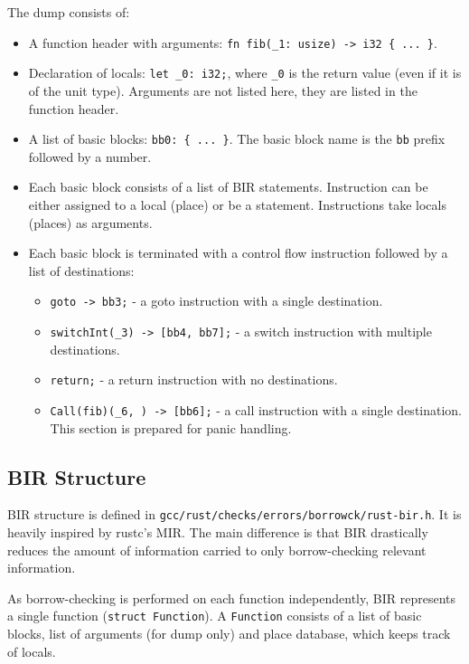 The dump consists of:

\begin{itemize}
\tightlist
\item
  A function header with arguments:
  \texttt{fn\ fib(\_1:\ usize)\ -\textgreater{}\ i32\ \{\ ...\ \}}.
\item
  Declaration of locals: \texttt{let\ \_0:\ i32;}, where \texttt{\_0} is
  the return value (even if it is of the unit type). Arguments are not
  listed here, they are listed in the function header.
\item
  A list of basic blocks: \texttt{bb0:\ \{\ ...\ \}}. The basic block
  name is the \texttt{bb} prefix followed by a number.
\item
  Each basic block consists of a list of BIR statements. Instruction can
  be either assigned to a local (place) or be a statement. Instructions
  take locals (places) as arguments.
\item
  Each basic block is terminated with a control flow instruction
  followed by a list of destinations:

  \begin{itemize}
  \tightlist
  \item
    \texttt{goto\ -\textgreater{}\ bb3;} - a goto instruction with a
    single destination.
  \item
    \texttt{switchInt(\_3)\ -\textgreater{}\ {[}bb4,\ bb7{]};} - a
    switch instruction with multiple destinations.
  \item
    \texttt{return;} - a return instruction with no destinations.
  \item
    \texttt{Call(fib)(\_6,\ )\ -\textgreater{}\ {[}bb6{]};} - a call
    instruction with a single destination. This section is prepared for
    panic handling.
  \end{itemize}
\end{itemize}

\hypertarget{bir-structure}{%
\subsection{BIR Structure}\label{bir-structure}}

BIR structure is defined in
\texttt{gcc/rust/checks/errors/borrowck/rust-bir.h}. It is heavily
inspired by rustc's MIR. The main difference is that BIR drastically
reduces the amount of information carried to only borrow-checking
relevant information.

As borrow-checking is performed on each function independently, BIR
represents a single function (\texttt{struct\ Function}). A
\texttt{Function} consists of a list of basic blocks, list of arguments
(for dump only) and place database, which keeps track of locals.


